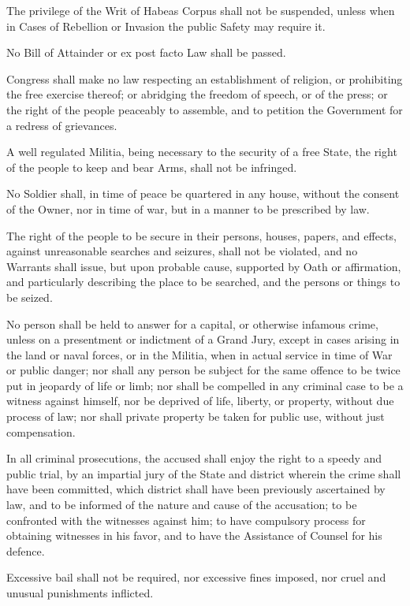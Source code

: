 \documentclass{constitution}
\begin{document}
The privilege of the Writ of Habeas Corpus shall not be suspended,
unless when in Cases of Rebellion or Invasion the public Safety may require it.

No Bill of Attainder or ex post facto Law shall be passed.

Congress shall make no law respecting an establishment of religion,
or prohibiting the free exercise thereof;
or abridging the freedom of speech, or of the press;
or the right of the people peaceably to assemble,
and to petition the Government for a redress of grievances.

A well regulated Militia, being necessary to the security of a free State,
the right of the people to keep and bear Arms, shall not be infringed.

No Soldier shall, in time of peace be quartered in any house,
without the consent of the Owner,
nor in time of war, but in a manner to be prescribed by law.

The right of the people to be secure in their persons, houses, papers, and effects,
against unreasonable searches and seizures, shall not be violated,
and no Warrants shall issue, but upon probable cause, supported by Oath or affirmation,
and particularly describing the place to be searched, and the persons or things to be seized.

No person shall be held to answer for a capital, or otherwise infamous crime,
unless on a presentment or indictment of a Grand Jury,
except in cases arising in the land or naval forces, or in the Militia,
when in actual service in time of War or public danger;
nor shall any person be subject for the same offence to be twice put in jeopardy of life or limb;
nor shall be compelled in any criminal case to be a witness against himself,
nor be deprived of life, liberty, or property, without due process of law;
nor shall private property be taken for public use, without just compensation.

In all criminal prosecutions,
the accused shall enjoy the right to a speedy and public trial,
by an impartial jury of the State and district wherein the crime shall have been committed,
which district shall have been previously ascertained by law,
and to be informed of the nature and cause of the accusation;
to be confronted with the witnesses against him;
to have compulsory process for obtaining witnesses in his favor,
and to have the Assistance of Counsel for his defence.

Excessive bail shall not be required,
nor excessive fines imposed,
nor cruel and unusual punishments inflicted.
\end{document}
